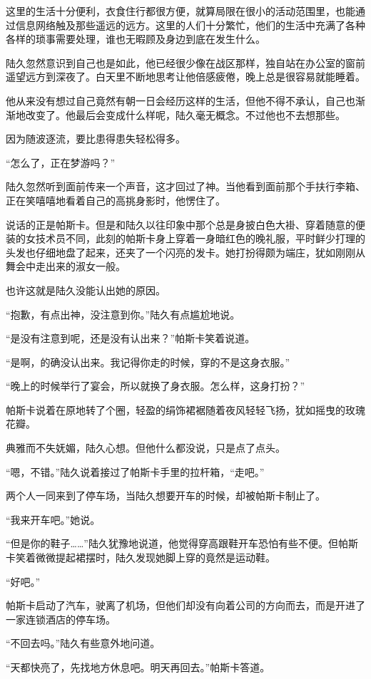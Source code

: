 这里的生活十分便利，衣食住行都很方便，就算局限在很小的活动范围里，也能通过信息网络触及那些遥远的远方。这里的人们十分繁忙，他们的生活中充满了各种各样的琐事需要处理，谁也无暇顾及身边到底在发生什么。

陆久忽然意识到自己也是如此，他已经很少像在战区那样，独自站在办公室的窗前遥望远方到深夜了。白天里不断地思考让他倍感疲倦，晚上总是很容易就能睡着。

他从来没有想过自己竟然有朝一日会经历这样的生活，但他不得不承认，自己也渐渐地改变了。他最后会变成什么样呢，陆久毫无概念。不过他也不去想那些。

因为随波逐流，要比患得患失轻松得多。

“怎么了，正在梦游吗？”

陆久忽然听到面前传来一个声音，这才回过了神。当他看到面前那个手扶行李箱、正在笑嘻嘻地看着自己的高挑身影时，他愣住了。

说话的正是帕斯卡。但是和陆久以往印象中那个总是身披白色大褂、穿着随意的便装的女技术员不同，此刻的帕斯卡身上穿着一身暗红色的晚礼服，平时鲜少打理的头发也仔细地盘了起来，还夹了一个闪亮的发卡。她打扮得颇为端庄，犹如刚刚从舞会中走出来的淑女一般。

也许这就是陆久没能认出她的原因。

“抱歉，有点出神，没注意到你。”陆久有点尴尬地说。

“是没有注意到呢，还是没有认出来？”帕斯卡笑着说道。

“是啊，的确没认出来。我记得你走的时候，穿的不是这身衣服。”

“晚上的时候举行了宴会，所以就换了身衣服。怎么样，这身打扮？”

帕斯卡说着在原地转了个圈，轻盈的绢饰裙裾随着夜风轻轻飞扬，犹如摇曳的玫瑰花瓣。

典雅而不失妩媚，陆久心想。但他什么都没说，只是点了点头。

“嗯，不错。”陆久说着接过了帕斯卡手里的拉杆箱，“走吧。”

两个人一同来到了停车场，当陆久想要开车的时候，却被帕斯卡制止了。

“我来开车吧。”她说。

“但是你的鞋子……”陆久犹豫地说道，他觉得穿高跟鞋开车恐怕有些不便。但帕斯卡笑着微微提起裙摆时，陆久发现她脚上穿的竟然是运动鞋。

“好吧。”

帕斯卡启动了汽车，驶离了机场，但他们却没有向着公司的方向而去，而是开进了一家连锁酒店的停车场。

“不回去吗。”陆久有些意外地问道。

“天都快亮了，先找地方休息吧。明天再回去。”帕斯卡答道。

